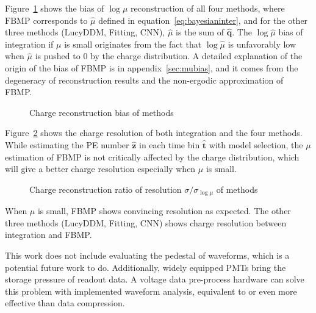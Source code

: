 Figure~\ref{fig:biasmu} shows the bias of $\log\mu$ reconstruction of all four methods, where $\mathrm{FBMP}$ corresponds to $\hat{\mu}$ defined in equation~\eqref{eq:bayesianinter}, and for the other three methods (LucyDDM, Fitting, CNN), $\hat{\mu}$ is the sum of $\hat{\bm{q}}$. The $\log\hat{\mu}$ bias of integration if $\mu$ is small originates from the fact that $\log\hat{\mu}$ is unfavorably low when $\hat{\mu}$ is pushed to 0 by the charge distribution. A detailed explanation of the origin of the bias of FBMP is in appendix~\ref{sec:mubias}, and it comes from the degeneracy of reconstruction results and the non-ergodic approximation of FBMP. 

\begin{figure}[H]
    \centering
    \resizebox{\textwidth}{!}{}
    \caption{\label{fig:biasmu} Charge reconstruction bias of methods}
\end{figure}

Figure~\ref{fig:deltamu} shows the charge resolution of both integration and the four methods. While estimating the PE number $\hat{\bm{z}}$ in each time bin $\hat{\bm{t}}$ with model selection, the $\mu$ estimation of FBMP is not critically affected by the charge distribution, which will give a better charge resolution especially when $\mu$ is small. 

\begin{figure}[H]
    \centering
    \resizebox{\textwidth}{!}{}
    \caption{\label{fig:deltamu} Charge reconstruction ratio of resolution $\sigma/\sigma_{\log\mu}$ of methods}
\end{figure}

When $\mu$ is small, FBMP shows convincing resolution as expected. The other three methods (LucyDDM, Fitting, CNN) shows charge resolution between integration and FBMP. 


This work does not include evaluating the pedestal of waveforms, which is a potential future work to do. Additionally, widely equipped PMTs bring the storage pressure of readout data. A voltage data pre-process hardware can solve this problem with implemented waveform analysis, equivalent to or even more effective than data compression. 
